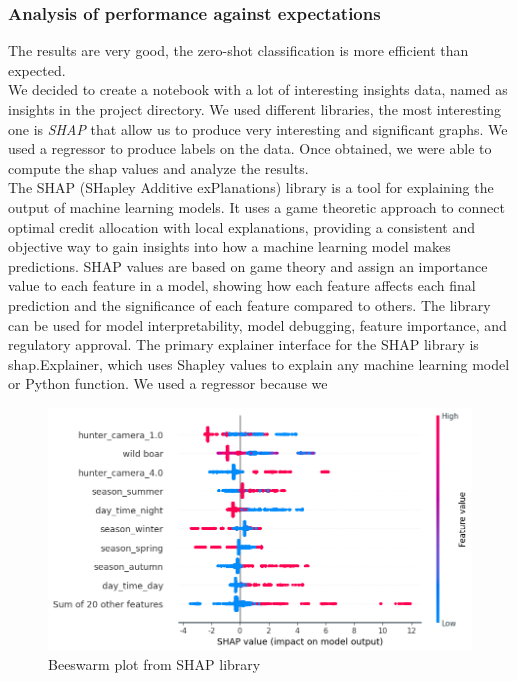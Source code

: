\documentclass[12pt,a4paper,twoside]{article}
\begin{document}
\subsubsection{Analysis of performance against expectations}
The results are very good, the zero-shot classification is more efficient than expected.\\
We decided to create a notebook with a lot of interesting insights data, named as insights in the project directory. We used different libraries, the most interesting one is \textit{SHAP} \cite{shap} that allow us to produce very interesting and significant graphs. We used a regressor to produce labels on the data. Once obtained, we were able to compute the shap values and analyze the results. \\ The SHAP (SHapley Additive exPlanations) library is a tool for explaining the output of machine learning models. It uses a game theoretic approach to connect optimal credit allocation with local explanations, providing a consistent and objective way to gain insights into how a machine learning model makes predictions. SHAP values are based on game theory and assign an importance value to each feature in a model, showing how each feature affects each final prediction and the significance of each feature compared to others. The library can be used for model interpretability, model debugging, feature importance, and regulatory approval. The primary explainer interface for the SHAP library is shap.Explainer, which uses Shapley values to explain any machine learning model or Python function. We used a regressor because we 

\begin{figure}[!ht]
    \centering
    \includegraphics[width=\textwidth,height=\textheight,keepaspectratio]{assets/shap-1.png}
    \caption{Beeswarm plot from SHAP library}
    \label{fig:}
\end{figure}
\end{document}
